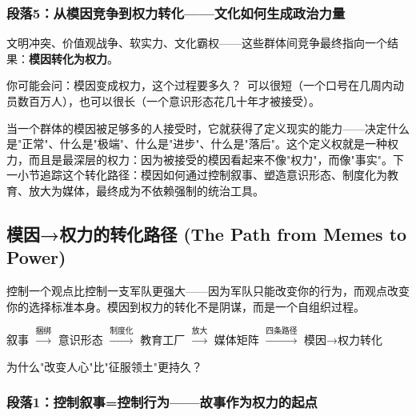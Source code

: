 \documentclass[../main.tex]{subfiles}
\begin{document}
	\subsubsection*{段落5：从模因竞争到权力转化——文化如何生成政治力量}

	文明冲突、价值观战争、软实力、文化霸权——这些群体间竞争最终指向一个结果：\textbf{模因转化为权力}。

	\begin{tcolorbox}[colback=yellow!5, title=\textit{读者行为预测}]

		你可能会问：模因变成权力，这个过程要多久？\ 可以很短（一个口号在几周内动员数百万人），也可以很长（一个意识形态花几十年才被接受）。

	\end{tcolorbox}

当一个群体的模因被足够多的人接受时，它就获得了定义现实的能力——决定什么是"正常"、什么是"极端"、什么是"进步"、什么是"落后"。这个定义权就是一种权力，而且是最深层的权力：因为被接受的模因看起来不像"权力"，而像"事实"。下一小节追踪这个转化路径：模因如何通过控制叙事、塑造意识形态、制度化为教育、放大为媒体，最终成为不依赖强制的统治工具。

	\subsection{模因→权力的转化路径 (The Path from Memes to Power)}

	\begin{motivation}

		控制一个观点比控制一支军队更强大——因为军队只能改变你的行为，而观点改变你的选择标准本身。模因到权力的转化不是阴谋，而是一个自组织过程。

	\end{motivation}

	\begin{logicmap}

		叙事 $\xrightarrow{\text{捆绑}}$ 意识形态 $\xrightarrow{\text{制度化}}$ 教育工厂 $\xrightarrow{\text{放大}}$ 媒体矩阵 $\xrightarrow{\text{四条路径}}$ 模因→权力转化

	\end{logicmap}

	\begin{questionbox}

		为什么"改变人心"比"征服领土"更持久？

	\end{questionbox}

	\subsubsection*{段落1：控制叙事=控制行为——故事作为权力的起点}
\end{document}
